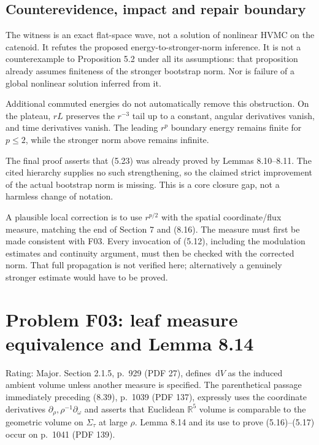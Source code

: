 \documentclass[10pt]{article}
\begin{document}
\subsection*{Counterevidence, impact and repair boundary}
The witness is an exact flat-space wave, not a solution of nonlinear HVMC on the catenoid. It refutes the proposed energy-to-stronger-norm inference. It is not a counterexample to Proposition 5.2 under all its assumptions: that proposition already assumes finiteness of the stronger bootstrap norm. Nor is failure of a global nonlinear solution inferred from it.\par
Additional commuted energies do not automatically remove this obstruction. On the plateau, \(rL\) preserves the \(r^{-3}\) tail up to a constant, angular derivatives vanish, and time derivatives vanish. The leading \(r^p\) boundary energy remains finite for \(p\leq2\), while the stronger norm above remains infinite.\par
The final proof asserts that (5.23) was already proved by Lemmas 8.10–8.11. The cited hierarchy supplies no such strengthening, so the claimed strict improvement of the actual bootstrap norm is missing. This is a core closure gap, not a harmless change of notation.\par
A plausible local correction is to use \(r^{p/2}\) with the spatial coordinate/flux measure, matching the end of Section 7 and (8.16). The measure must first be made consistent with F03. Every invocation of (5.12), including the modulation estimates and continuity argument, must then be checked with the corrected norm. That full propagation is not verified here; alternatively a genuinely stronger estimate would have to be proved.\par
\section*{Problem F03: leaf measure equivalence and Lemma 8.14}
Rating: Major. Section 2.1.5, p. 929 (PDF 27), defines \(\,\mathrm dV\) as the induced ambient volume unless another measure is specified. The parenthetical passage immediately preceding (8.39), p. 1039 (PDF 137), expressly uses the coordinate derivatives \(\partial_\rho,\rho^{-1}\partial_\omega\) and asserts that Euclidean \(\mathbb R^5\) volume is comparable to the geometric volume on \(\Sigma_\tau\) at large \(\rho\). Lemma 8.14 and its use to prove (5.16)–(5.17) occur on p. 1041 (PDF 139).\par
\end{document}
